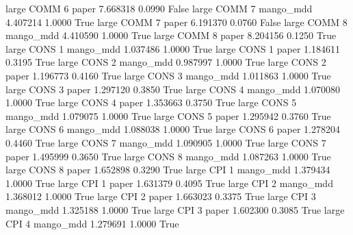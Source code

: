      large     COMM                 6                 paper      7.668318      0.0990   False
     large     COMM                 7             mango_mdd      4.407214      1.0000    True
     large     COMM                 7                 paper      6.191370      0.0760   False
     large     COMM                 8             mango_mdd      4.410590      1.0000    True
     large     COMM                 8                 paper      8.204156      0.1250    True
     large     CONS                 1             mango_mdd      1.037486      1.0000    True
     large     CONS                 1                 paper      1.184611      0.3195    True
     large     CONS                 2             mango_mdd      0.987997      1.0000    True
     large     CONS                 2                 paper      1.196773      0.4160    True
     large     CONS                 3             mango_mdd      1.011863      1.0000    True
     large     CONS                 3                 paper      1.297120      0.3850    True
     large     CONS                 4             mango_mdd      1.070080      1.0000    True
     large     CONS                 4                 paper      1.353663      0.3750    True
     large     CONS                 5             mango_mdd      1.079075      1.0000    True
     large     CONS                 5                 paper      1.295942      0.3760    True
     large     CONS                 6             mango_mdd      1.088038      1.0000    True
     large     CONS                 6                 paper      1.278204      0.4460    True
     large     CONS                 7             mango_mdd      1.090905      1.0000    True
     large     CONS                 7                 paper      1.495999      0.3650    True
     large     CONS                 8             mango_mdd      1.087263      1.0000    True
     large     CONS                 8                 paper      1.652898      0.3290    True
     large      CPI                 1             mango_mdd      1.379434      1.0000    True
     large      CPI                 1                 paper      1.631379      0.4095    True
     large      CPI                 2             mango_mdd      1.368012      1.0000    True
     large      CPI                 2                 paper      1.663023      0.3375    True
     large      CPI                 3             mango_mdd      1.325188      1.0000    True
     large      CPI                 3                 paper      1.602300      0.3085    True
     large      CPI                 4             mango_mdd      1.279691      1.0000    True
